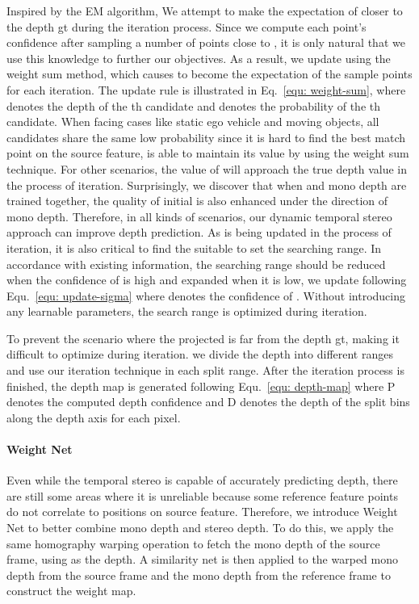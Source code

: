 \documentclass[letterpaper]{article} \usepackage[]{aaai23}  \usepackage{times}  \usepackage{helvet}  \usepackage{courier}  \usepackage[hyphens]{url}  \usepackage{graphicx} \urlstyle{rm} \def\UrlFont{\rm}  \usepackage{natbib}  \usepackage{caption} \frenchspacing  \setlength{\pdfpagewidth}{8.5in} \setlength{\pdfpageheight}{11in} \usepackage{algorithm}
\begin{document}
Inspired by the EM algorithm, We attempt to make the expectation of  closer to the depth gt during the iteration process. Since we compute each point's confidence after sampling a number of points close to , it is only natural that we use this knowledge to further our objectives. As a result, we update  using the weight sum method, which causes  to become the expectation of the sample points for each iteration. The update rule is illustrated in Eq.~\ref{equ: weight-sum}, where  denotes the depth of the th candidate and  denotes the probability of the th candidate. When facing cases like static ego vehicle and moving objects, all candidates share the same low probability since it is hard to find the best match point on the source feature,  is able to maintain its value by using the weight sum technique. For other scenarios, the value of  will approach the true depth value in the process of iteration. Surprisingly, we discover that when  and mono depth are trained together, the quality of initial  is also enhanced under the direction of mono depth. Therefore, in all kinds of scenarios, our dynamic temporal stereo approach can improve depth prediction. As  is being updated in the process of iteration, it is also critical to find the suitable  to set the searching range. In accordance with existing information, the searching range should be reduced when the confidence of  is high and expanded when it is low, we update  following Equ.~\ref{equ: update-sigma} where  denotes the confidence of . Without introducing any learnable parameters, the search range is optimized during iteration. 

To prevent the scenario where the projected  is far from the depth gt, making it difficult to optimize  during iteration. we divide the depth into different ranges and use our iteration technique in each split range. After the iteration process is finished, the depth map is generated following  Equ.~\ref{equ: depth-map} where P denotes the computed depth confidence and D denotes the depth of the split bins along the depth axis for each pixel. 






\paragraph{Weight Net}
Even while the temporal stereo is capable of accurately predicting depth, there are still some areas where it is unreliable because some reference feature points do not correlate to positions on source feature. Therefore, we introduce Weight Net to better combine mono depth and stereo depth. To do this, we apply the same homography warping operation to fetch the mono depth of the source frame, using  as the depth. A similarity net is then applied to the warped mono depth from the source frame and the mono depth from the reference frame to construct the weight map.
\end{document}
